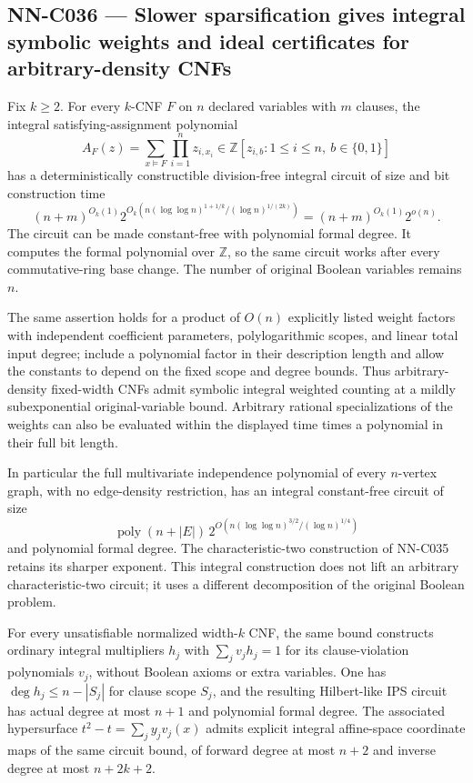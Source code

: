 \subsection{NN-C036 --- Slower sparsification gives integral symbolic weights and ideal certificates for arbitrary-density CNFs}
\begin{proposition}[NN-C036]
Fix $k\ge2$. For every $k$-CNF $F$ on $n$ declared variables with $m$ clauses, the integral satisfying-assignment polynomial
\[
       A_F(z)=\sum_{x\models F}\prod_{i=1}^n z_{i,x_i}
                      \in\mathbb Z[z_{i,b}:1\le i\le n,\ b\in\{0,1\}]
\]
has a deterministically constructible division-free integral circuit of size and bit construction time
\[
 (n+m)^{O_k(1)}
  2^{O_k\!\left(n(\log\log n)^{1+1/k}/(\log n)^{1/(2k)}\right)}
                                                    = (n+m)^{O_k(1)}2^{o(n)}.
\]
The circuit can be made constant-free with polynomial formal degree. It computes the formal polynomial over $\mathbb Z$, so the same circuit works after every commutative-ring base change. The number of original Boolean variables remains $n$.

The same assertion holds for a product of $O(n)$ explicitly listed weight factors with independent coefficient parameters, polylogarithmic scopes, and linear total input degree; include a polynomial factor in their description length and allow the constants to depend on the fixed scope and degree bounds. Thus arbitrary-density fixed-width CNFs admit symbolic integral weighted counting at a mildly subexponential original-variable bound. Arbitrary rational specializations of the weights can also be evaluated within the displayed time times a polynomial in their full bit length.

In particular the full multivariate independence polynomial of every $n$-vertex graph, with no edge-density restriction, has an integral constant-free circuit of size
\[
 \operatorname{poly}(n+|E|)\,
       2^{O\!\left(n(\log\log n)^{3/2}/(\log n)^{1/4}\right)}
\]
and polynomial formal degree. The characteristic-two construction of NN-C035 retains its sharper exponent. This integral construction does not lift an arbitrary characteristic-two circuit; it uses a different decomposition of the original Boolean problem.

For every unsatisfiable normalized width-$k$ CNF, the same bound constructs ordinary integral multipliers $h_j$ with $\sum_jv_jh_j=1$ for its clause-violation polynomials $v_j$, without Boolean axioms or extra variables. One has $\deg h_j\le n-|S_j|$ for clause scope $S_j$, and the resulting Hilbert-like IPS circuit has actual degree at most $n+1$ and polynomial formal degree. The associated hypersurface $t^2-t=\sum_jy_jv_j(x)$ admits explicit integral affine-space coordinate maps of the same circuit bound, of forward degree at most $n+2$ and inverse degree at most $n+2k+2$.
\end{proposition}
